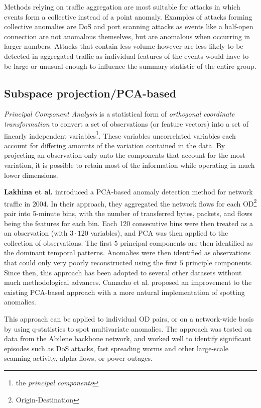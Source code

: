 \documentclass[a4paper,12pt,twoside]{report}
\begin{document}
Methods relying on traffic aggregation are most suitable for attacks in which events form a collective instead of a point anomaly. Examples  of attacks forming collective anomalies are DoS and port scanning attacks as events like a half-open connection are not anomalous themselves, but are anomalous when occurring in larger numbers. Attacks that contain less volume however are less likely to be detected in aggregated traffic as individual features of the events would have to be large or unusual enough to influence the summary statistic of the entire group.


\subsection{Subspace projection/PCA-based}

\textit{Principal Component Analysis} is a statistical form of \textit{orthogonal coordinate transformation} to convert a set of observations (or feature vectors) into a set of linearly independent variables\footnote{the \textit{principal components}}. These variables uncorrelated variables each account for differing amounts of the variation contained in the data. By projecting an observation only onto the components that account for the most variation, it is possible to retain most of the information while operating in much lower dimensions.

\textbf{Lakhina et al.} \cite{lakhina_diagnosing_2004,lakhina_characterization_2004}  introduced a PCA-based anomaly detection method for network traffic in 2004. In their approach, they aggregated the network flows for each OD\footnote{Origin-Destination} pair into 5-minute bins, with the number of transferred bytes, packets, and flows being the features for each bin. Each 120 consecutive bins were then treated as a an observation (with $3\cdot 120$ variables), and PCA was then applied to the collection of observations. The first $5$ principal components are then identified as the dominant temporal patterns. Anomalies were then identified as observations that could only very poorly reconstructed using the first $5$ principle components. Since then, this approach has been adopted to several other datasets without much methodological advances. Camacho et al. \cite{camacho_pca-based_2016} proposed an improvement to the existing PCA-based approach with a more natural implementation of spotting anomalies. 

This approach can be applied to individual OD pairs, or on a network-wide basis by using q-statistics to spot multivariate anomalies. The approach was tested on data from the Abilene backbone network, and worked well to identify significant episodes such as DoS attacks, fast spreading worms and other large-scale scanning activity, alpha-flows, or power outages. 
\end{document}
